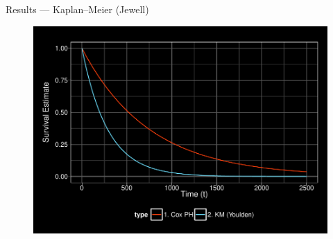 \documentclass[12pt,t,handout]{beamer}
\begin{document}
\begin{frame}[c]{Results --- Kaplan--Meier (Jewell)}

\begin{center}
\begin{figure}[H]
\begin{center}
\includegraphics[width=\textwidth]{Figs/s1_cox_youlden.pdf}
\end{center}
\label{fig:s1_cox_youlden}
\end{figure}
\end{center}

\note{
}

\end{frame}

\end{document}
